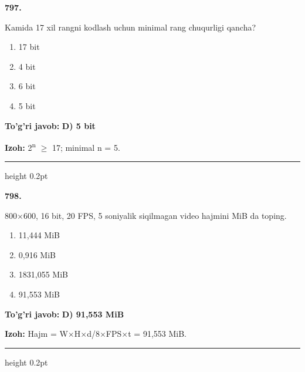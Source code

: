 \documentclass[10pt,a4paper,oneside]{article}
\begin{document}
\noindent\textbf{\color{ink}797.}
\par
Kamida 17 xil rangni kodlash uchun minimal rang chuqurligi qancha?
\begin{enumerate}[label=\Alph*),leftmargin=9mm]
\item 17 bit
\item 4 bit
\item 6 bit
\item 5 bit
\end{enumerate}
\begin{tcolorbox}[enhanced,breakable,colback=teal!4,colframe=teal!50!black,boxrule=0.5pt,arc=1.1mm,left=3mm,right=3mm,top=1.7mm,bottom=1.7mm,before skip=2mm,after skip=2mm]
\textbf{\color{teal}To'g'ri javob:} \textbf{D) 5 bit}
\par\smallskip
\textbf{Izoh:} 2\textsuperscript{n} \ensuremath{\geq} 17; minimal n = 5.
\end{tcolorbox}
\vspace{2mm}\hrule height 0.2pt \vspace{3mm}

\noindent\textbf{\color{ink}798.}
\par
800\ensuremath{\times}600, 16 bit, 20 FPS, 5 soniyalik siqilmagan video hajmini MiB da toping.
\begin{enumerate}[label=\Alph*),leftmargin=9mm]
\item 11,444 MiB
\item 0,916 MiB
\item 1831,055 MiB
\item 91,553 MiB
\end{enumerate}
\begin{tcolorbox}[enhanced,breakable,colback=teal!4,colframe=teal!50!black,boxrule=0.5pt,arc=1.1mm,left=3mm,right=3mm,top=1.7mm,bottom=1.7mm,before skip=2mm,after skip=2mm]
\textbf{\color{teal}To'g'ri javob:} \textbf{D) 91,553 MiB}
\par\smallskip
\textbf{Izoh:} Hajm = W\ensuremath{\times}H\ensuremath{\times}d/8\ensuremath{\times}FPS\ensuremath{\times}t = 91,553 MiB.
\end{tcolorbox}
\vspace{2mm}\hrule height 0.2pt \vspace{3mm}
\end{document}
